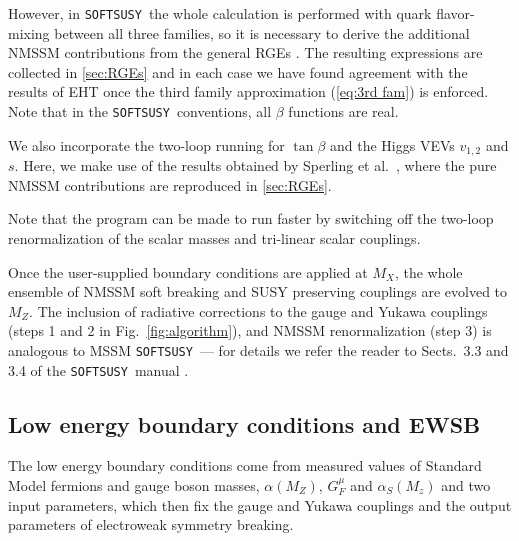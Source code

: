 \documentclass[final,3p,times,pdflatex]{elsarticle}
\def\SOFTSUSY{{\tt SOFTSUSY}\ }
\begin{document}
However, in \SOFTSUSY the whole calculation is performed with quark 
flavor-mixing between all three families, so it is necessary to derive the 
additional NMSSM contributions from the general RGEs \cite{MV94,Yam94}.  The 
resulting expressions are collected in \ref{sec:RGEs} and in each case we have 
found agreement with the results of EHT \cite{Ellwanger:2009dp} once the third family approximation 
(\ref{eq:3rd fam}) is enforced.  Note that in the \SOFTSUSY conventions, all 
$\beta$ functions are real.

We also incorporate the two-loop running for $\tan\beta$ and the Higgs VEVs  
$v_{1,2}$ and $s$.  Here, we make use of the results obtained by 
Sperling et al.\ \cite{Sper13}, where the pure   NMSSM contributions are 
reproduced in \ref{sec:RGEs}.

Note that the program can be made to run faster by switching off the two-loop
 renormalization of the scalar masses and tri-linear scalar couplings.

Once the user-supplied boundary conditions are applied at $M_X$, the whole 
ensemble of NMSSM soft breaking and SUSY preserving couplings are evolved to 
$M_Z$. The inclusion of radiative corrections to the gauge and Yukawa couplings 
(steps 1 and 2 in Fig.\ \ref{fig:algorithm}), and NMSSM renormalization (step 3)
 is analogous to MSSM \SOFTSUSY --- for details we refer the reader to Sects.\ 
3.3 and 3.4 of the \SOFTSUSY manual \cite{Allanach:2001kg}.

\subsection{Low energy boundary conditions and EWSB \label{ewsb}}
The low energy boundary conditions come from measured values of
Standard Model fermions and gauge boson masses, $\alpha(M_Z)$,
$G_F^\mu$ and $\alpha_S(M_z)$ and two input parameters, which then fix
the gauge and Yukawa couplings and the output parameters of
electroweak symmetry breaking.
 
\end{document}
